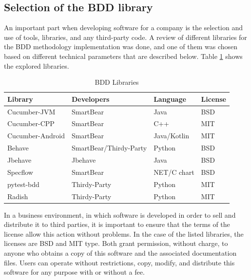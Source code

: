 \documentclass[journal]{IEEEtran}	%
\begin{document}
\subsection{Selection of the BDD library}


An important part when developing software for a company is the selection and use of tools, libraries, and any third-party code. A review of different libraries for the BDD methodology implementation was done, and one of them was chosen based on different technical parameters that are described below. Table \ref{tab:libraries} shows the explored libraries.

\begin{table}[h!t!]
\renewcommand{\arraystretch}{1.25}		%
\centering
\caption{BDD Libraries}	%
\label{tab:libraries}
\begin{tabular}{l|l|l|l}					%
\hline \hline
\textbf{Library}        				&   \textbf{Developers}     &	\textbf{Language}	&	\textbf{License}			\\
\hline
Cucumber-JVM        &   SmartBear	            &	Java            &   BSD\\
Cucumber-CPP        &   SmartBear	            &	C++             &   MIT\\
Cucumber-Android    &   SmartBear	            &	Java/Kotlin     &   MIT\\
Behave              &   SmartBear/Thirdy-Party	&	Python          &   BSD\\
Jbehave             &   Jbehave	                &	Java            &   BSD\\
Specflow            &   SmartBear	            &	NET/C chart     &   BSD\\
pytest-bdd          &   Thirdy-Party	        &	Python          &   MIT\\
Radish              &   Thirdy-Party	        &	Python          &   MIT\\
\hline \hline
\end{tabular}
\end{table}

In a business environment, in which software is developed in order to sell and distribute it to third parties, it is important to ensure that the terms of the license allow this action without problems. In the case of the listed libraries, the licenses are BSD and MIT type. Both grant permission, without charge, to anyone who obtains a copy of this software and the associated documentation files. Users can operate without restrictions, copy, modify, and distribute this software for any purpose with or without a fee.
\end{document}
